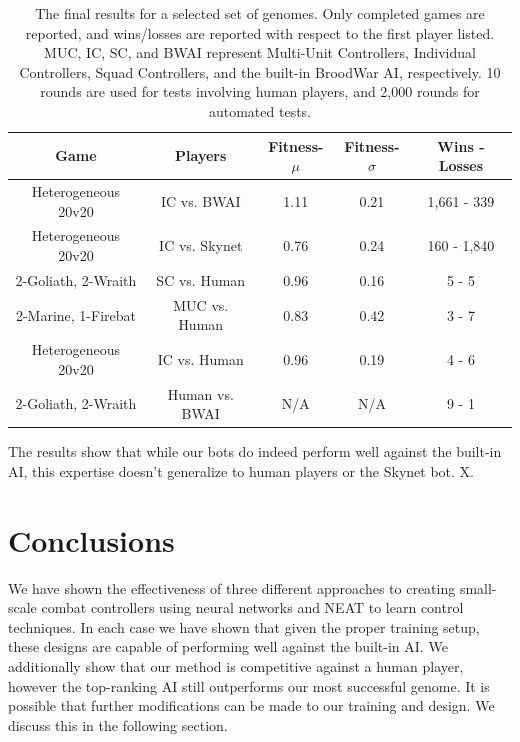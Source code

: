 \documentclass[a4paper]{article}
\newcommand{\fillin}[1]{X}
\begin{document}
\begin{table}
\centering
\begin{tabular}{|c|c|c|c|c|}
	\hline
	{\bf Game} & {\bf Players } & {\bf Fitness-$\mu$} & {\bf Fitness-$\sigma$} & {\bf Wins - Losses } \\ \hline
	Heterogeneous 20v20 & IC vs. BWAI & 1.11 & 0.21 & 1,661 - 339\\ \hline
	Heterogeneous 20v20 & IC vs. Skynet \cite{skynet} & 0.76 & 0.24 &  160 - 1,840 \\ \hline
	2-Goliath, 2-Wraith & SC vs. Human & 0.96 & 0.16 & 5 - 5 \\ \hline
	2-Marine, 1-Firebat & MUC vs. Human & 0.83 & 0.42 & 3 - 7 \\ \hline
	Heterogeneous 20v20 & IC vs. Human & 0.96 & 0.19 & 4 - 6 \\ \hline
	2-Goliath, 2-Wraith & Human vs. BWAI & N/A & N/A & 9 - 1\\ \hline
\end{tabular}
\caption{The final results for a selected set of genomes. Only completed games are reported, and wins/losses are reported with respect to the first player listed. MUC, IC, SC, and BWAI represent Multi-Unit Controllers, Individual Controllers, Squad Controllers, and the built-in BroodWar AI, respectively. 10 rounds are used for tests involving human players, and 2,000 rounds for automated tests.}
\label{tab:results}
\end{table}

The results show that while our bots do indeed perform well against the built-in AI, this expertise doesn't generalize to human players or the Skynet bot. \fillin{Talk about why - if we can evolve a controller to do well against skynet, then that shows it's most likely overfitting or a deficient built-in AI, and could be resolved in the general case w/ competitive evolution}.
\section{Conclusions}
\label{sec:conclusion}

We have shown the effectiveness of three different approaches to creating small-scale combat controllers using neural networks and NEAT to learn control techniques. In each case we have shown that given the proper training setup, these designs are capable of performing well against the built-in AI. We additionally show that our method is competitive against a human player, however the top-ranking AI still outperforms our most successful genome. It is possible that further modifications can be made to our training and design. We discuss this in the following section.
\end{document}
